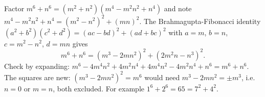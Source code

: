 Factor $m^6+n^6=(m^2+n^2)(m^4-m^2n^2+n^4)$ and note $m^4-m^2n^2+n^4=(m^2-n^2)^2+(mn)^2$. The Brahmagupta-Fibonacci identity $(a^2+b^2)(c^2+d^2)=(ac-bd)^2+(ad+bc)^2$ with $a=m$, $b=n$, $c=m^2-n^2$, $d=mn$ gives
\[
\boxed{m^6+n^6=\left(m^3-2mn^2\right)^2+\left(2m^2n-n^3\right)^2}.
\]
Check by expanding: $m^6-4m^4n^2+4m^2n^4+4m^4n^2-4m^2n^4+n^6=m^6+n^6$. The squares are new: $(m^3-2mn^2)^2=m^6$ would need $m^3-2mn^2=\pm m^3$, i.e. $n=0$ or $m=n$, both excluded. For example $1^6+2^6=65=7^2+4^2$.
